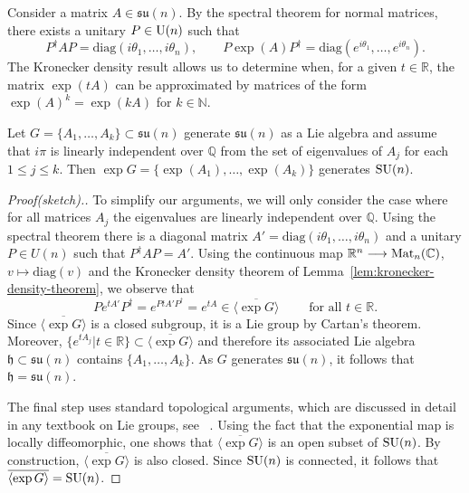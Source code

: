 \documentclass[a4paper, oneside, 12pt]{amsart}
\begin{document}
Consider a matrix \( A \in \mathfrak{su}(n) \).
By the spectral theorem for normal matrices, there exists a unitary \( P \in \operatorname{U}(n) \) such that
\begin{equation*}
  P^\dagger A P = \mathrm{diag}(i \theta_1, \dots, i \theta_n), \qquad  P \exp(A) P^\dagger = \mathrm{diag}(e^{i \theta_1}, \dots, e^{i \theta_n}).
\end{equation*}
The Kronecker density result allows us to determine when, for a given \( t \in \mathbb{R} \), the matrix \( \exp(tA) \) can be approximated by matrices of the form \( \exp(A)^k = \exp(kA) \) for \( k \in \mathbb{N} \).

\begin{theorem}
  Let \( G = \{ A_1, \dots, A_k \} \subset \mathfrak{su}(n) \) generate \(\mathfrak{su}(n) \) as a Lie algebra
  and assume that \(i \pi\) is linearly independent over \( \mathbb{Q}\) from the set of eigenvalues of \(A_{j}\) for each \(1\leq j \leq k\).
  Then \(\exp{G} =\{ \exp(A_{1}), \dots , \exp(A_{k})\}\) generates \(\operatorname{SU}(n)\).
\end{theorem}

\begin{proof}[Proof(sketch).]
  To simplify our arguments, we will only consider the case where for all matrices \(A_{j}\) the eigenvalues are linearly independent over \( \mathbb{Q}\).
  Using the spectral theorem there is a diagonal matrix \(A'=\mathrm{diag}(i \theta_1, \dots, i \theta_n)\) and a unitary \(P\in U(n)\) such that \(P^{\dagger} A P = A'\).
  Using the continuous map \( \mathbb{R}^{n} \longrightarrow \operatorname{Mat}_{n}( \mathbb{C})\), \(v \mapsto \mathrm{diag}(v)\) and the Kronecker density theorem of Lemma~\ref{lem:kronecker-density-theorem}, we observe that
  \begin{equation*}
    P e^{t A'} P^{\dagger}  = e^{P t A' P^{\dagger}} = e^{tA}\in \overline{\langle \exp{G} \rangle} \qquad \text{ for all } t \in \mathbb{R}.
  \end{equation*}
  Since \(\overline{\langle \exp{G} \rangle}\) is a closed subgroup, it is a Lie group by Cartan's theorem.
  Moreover, \(\{e^{tA_{j}}| t \in \mathbb{R}\} \subset \overline{\langle \exp{G} \rangle}\) and therefore its associated Lie algebra \( \mathfrak{h} \subset \mathfrak{su}(n) \) contains \( \{ A_1, \dots, A_k\}\).
  As \(G\) generates \( \mathfrak{su}(n)\), it follows that \( \mathfrak{h} = \mathfrak{su}(n)\).

  The final step uses standard topological arguments, which are discussed in detail in any textbook on Lie groups, see \eg~\cite{hall2015:LieGroupsLieAlgebrasRepresentations}.
  Using the fact that the exponential map is locally diffeomorphic, one shows that \( \overline{\langle \exp{G} \rangle} \) is an open subset of \( \operatorname{SU}(n) \).
  By construction, \( \overline{\langle \exp{G} \rangle} \) is also closed.
  Since \( \operatorname{SU}(n) \) is connected, it follows that \( \overline{\langle \exp{G} \rangle} = \operatorname{SU}(n) \).
\end{proof}
\end{document}
